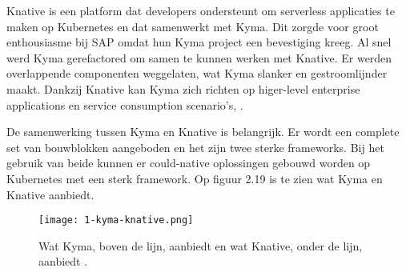 Knative is een platform dat developers ondersteunt om serverless applicaties te maken op Kubernetes en dat samenwerkt met Kyma. Dit zorgde voor groot enthousiasme bij SAP omdat hun Kyma project een bevestiging kreeg. Al snel  werd Kyma gerefactored om samen te kunnen  werken met Knative. Er werden overlappende componenten  weggelaten, wat Kyma slanker en gestroomlijnder maakt. Dankzij Knative kan Kyma zich richten op higer-level enterprise applications en service consumption scenario's, \textcite{Semerdzhiev2018}.

De samenwerking tussen Kyma en Knative is belangrijk. Er wordt een complete set van bouwblokken aangeboden en het zijn twee sterke frameworks. Bij het gebruik van beide kunnen er could-native oplossingen gebouwd worden op Kubernetes met een sterk framework. Op figuur 2.19 is te zien wat Kyma en Knative aanbiedt. \textcite{Hofmann2018}
\begin{figure}[h!]
	\texttt{[image: 1-kyma-knative.png]}
	\caption{Wat Kyma, boven de lijn, aanbiedt en wat Knative, onder de lijn, aanbiedt \textcite{Hofmann2018}.}
	\centering
\end{figure}


